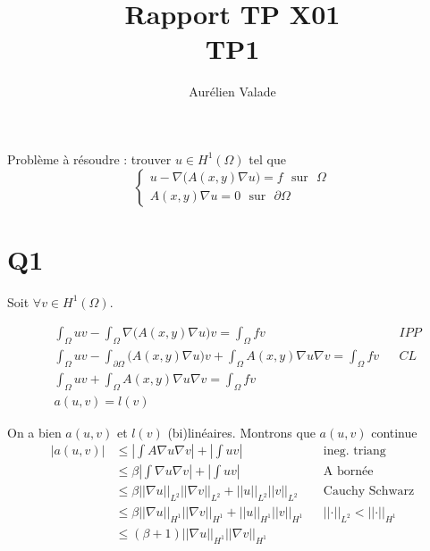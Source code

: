 \documentclass[11pt]{article}
\title{Rapport TP X01 \\ TP1}
\author{Aurélien Valade}
\date{}
\newcommand{\ms}{~~~}
\newcommand{\norm}[1]{\left|\left|#1\right|\right|}
\begin{document}
\maketitle

Problème à résoudre : trouver $u \in H^1(\Omega)$ tel que  
\begin{equation}
  \begin{cases}
    u - \nabla \big(A(x,y) \nabla u\big) = f \ms \mbox{sur}\ms \Omega\\
    A(x,y) \nabla u = 0 \ms \mbox{sur}\ms \partial\Omega
  \end{cases}
\end{equation}

\section{Q1}

Soit $\forall v\in H^1(\Omega)$.

\begin{align}
  \label{eq:var}
  &\int_{\Omega} uv - \int_{\Omega} \nabla \big(A(x,y) \nabla u\big) v = \int_{\Omega} f v && IPP \\
  &\int_{\Omega} uv - \int_{\partial \Omega} \big(A(x,y) \nabla u\big) v + \int_{ \Omega} A(x,y) \nabla u \nabla v  = \int_{\Omega} f v  && CL\\
  &\int_{\Omega} uv + \int_{ \Omega} A(x,y) \nabla u \nabla v  = \int_{\Omega} f v \\
  &a(u,v) = l(v)
\end{align}

On a bien $a(u,v)$ et $l(v)$ (bi)linéaires. Montrons que $a(u,v)$ continue 
\begin{align}
  \label{eq:ac}
  |a(u,v)| &\leq \left| \int A \nabla u \nabla v \right| + \left| \int u v \right| && \mbox{ineg. triang} \\
           &\leq \beta \left| \int \nabla u \nabla v \right| + \left| \int u v \right| && \mbox{A bornée} \\
           &\leq \beta \norm{\nabla u}_{L^2} \norm{\nabla v}_{L^2} + \norm{u}_{L^2}\norm{v}_{L^2} && \mbox{Cauchy Schwarz} \\
           &\leq \beta \norm{\nabla u}_{H^1} \norm{\nabla v}_{H^1} + \norm{u}_{H^1}\norm{v}_{H^1} && \norm{\cdot}_{L^2}<\norm{\cdot}_{H^1} \\
           &\leq (\beta+1) \norm{\nabla u}_{H^1} \norm{\nabla v}_{H^1}   \\
\end{align}
\end{document}
